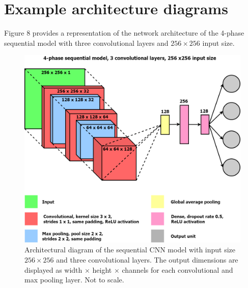 \documentclass[12pt]{article}
\begin{document}
\section{Example architecture diagrams}
Figure 8 provides a representation of the network architecture of the 4-phase sequential model with three convolutional layers and $256 \times 256$ input size.
\begin{figure}[!htb]
\centering
\includegraphics[width=5.5812in]{images/v3_conv_3_diagram.png}
\caption{Architectural diagram of the sequential CNN model with input size $256 \times 256$ and three convolutional layers. The output dimensions are displayed as width $\times$ height $\times$ channels for each convolutional and max pooling layer. Not to scale.}
\end{figure}
\end{document}
